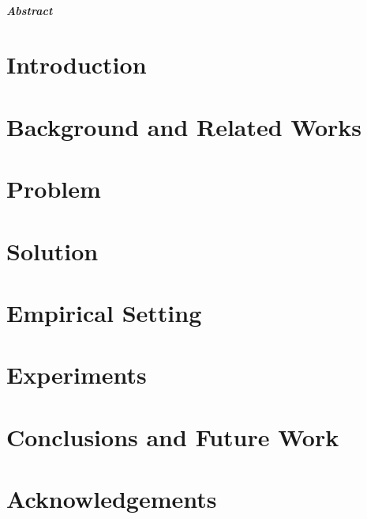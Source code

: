 \documentclass[12pt, oneside, titlepage, a4paper, openright]{report}
\begin{document}
\begin{frontespizio}
\Rientro {1.5cm}
\end{frontespizio}



\tableofcontents

\newpage

\paragraph{Abstract}


\chapter{Introduction}\label{chap:intro}



\chapter{Background and Related Works}\label{chap:related}


\chapter{Problem}\label{chap:problem}



\chapter{Solution}\label{chap:solution}


\chapter{Empirical Setting} \label{chap:ros}


\chapter{Experiments}\label{chap:experiments}


\chapter{Conclusions and Future Work}\label{chap:conclusions}


\chapter*{Acknowledgements}

%
%
\end{document}

